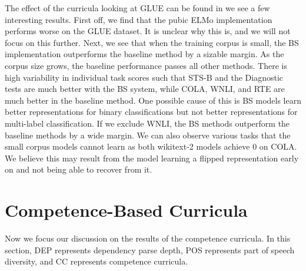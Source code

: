 The effect of the curricula looking at GLUE can be found in  we see a few interesting results. First off, we find that the pubic ELMo implementation performs worse on the GLUE dataset. It is unclear why this is, and we will not focus on this further. Next, we see that when the training corpus is small, the BS implementation outperforms the baseline method by a sizable margin. As the corpus size grows, the baseline performance passes all other methods. There is high variability in individual task scores such that STS-B and the Diagnostic tests are much better with the BS system, while COLA, WNLI, and RTE are much better in the baseline method. One possible cause of this is BS models learn better representations for binary classifications but not better representations for multi-label classification. If we exclude WNLI, the BS methods outperform the baseline methods by a wide margin. We can also observe various tasks that the small corpus models cannot learn as both wikitext-2 models achieve 0 on COLA. We believe this may result from the model learning a flipped representation early on and not being able to recover from it. 
\section{Competence-Based Curricula}
Now we focus our discussion on the results of the competence curricula. In this section, DEP represents dependency parse depth, POS represents part of speech diversity, and CC represents competence curricula.
